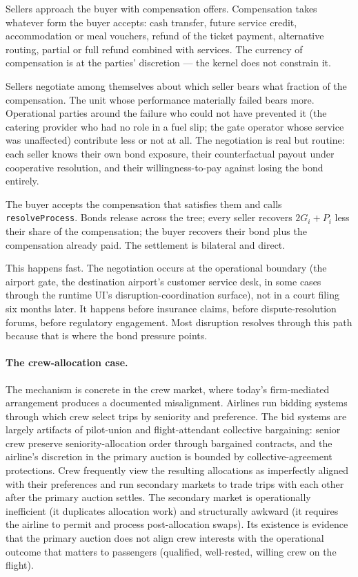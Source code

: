 \documentclass[11pt,a4paper]{article}
\theoremstyle{definition}
\theoremstyle{remark}
\begin{document}
Sellers approach the buyer with compensation offers. Compensation
takes whatever form the buyer accepts: cash transfer, future
service credit, accommodation or meal vouchers, refund of the
ticket payment, alternative routing, partial or full refund
combined with services. The currency of compensation is at the
parties' discretion --- the kernel does not constrain it.

Sellers negotiate among themselves about which seller bears what
fraction of the compensation. The unit whose performance
materially failed bears more. Operational parties around the
failure who could not have prevented it (the catering provider
who had no role in a fuel slip; the gate operator whose service
was unaffected) contribute less or not at all. The negotiation is
real but routine: each seller knows their own bond exposure,
their counterfactual payout under cooperative resolution, and
their willingness-to-pay against losing the bond entirely.

The buyer accepts the compensation that satisfies them and calls
\texttt{resolveProcess}. Bonds release across the tree; every
seller recovers $2G_i + P_i$ less their share of the
compensation; the buyer recovers their bond plus the compensation
already paid. The settlement is bilateral and direct.

This happens fast. The negotiation occurs at the operational
boundary (the airport gate, the destination airport's customer
service desk, in some cases through the runtime UI's
disruption-coordination surface), not in a court filing six
months later. It happens before insurance claims, before
dispute-resolution forums, before regulatory engagement. Most
disruption resolves through this path because that is where the
bond pressure points.

\paragraph{The crew-allocation case.}
The mechanism is concrete in the crew market, where today's
firm-mediated arrangement produces a documented misalignment.
Airlines run bidding systems through which crew select trips by
seniority and preference. The bid systems are largely artifacts
of pilot-union and flight-attendant collective bargaining: senior
crew preserve seniority-allocation order through bargained
contracts, and the airline's discretion in the primary auction is
bounded by collective-agreement protections. Crew frequently view
the resulting allocations as imperfectly aligned with their
preferences and run secondary markets to trade trips with each
other after the primary auction settles. The secondary market is
operationally inefficient (it duplicates allocation work) and
structurally awkward (it requires the airline to permit and
process post-allocation swaps). Its existence is evidence that
the primary auction does not align crew interests with the
operational outcome that matters to passengers (qualified,
well-rested, willing crew on the flight).
\end{document}
